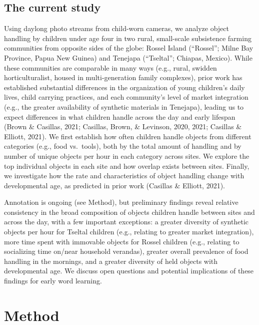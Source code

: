 \documentclass[10pt, letterpaper]{article}
\begin{document}
\hypertarget{the-current-study}{%
\subsection{The current study}\label{the-current-study}}

Using daylong photo streams from child-worn cameras, we analyze object
handling by children under age four in two rural, small-scale
subsistence farming communities from opposite sides of the globe: Rossel
Island (``Rossel''; Milne Bay Province, Papua New Guinea) and Tenejapa
(``Tseltal''; Chiapas, Mexico). While these communities are comparable
in many ways (e.g., rural, swidden horticulturalist, housed in
multi-generation family complexes), prior work has established
substantial differences in the organization of young children's daily
lives, child carrying practices, and each community's level of market
integration (e.g., the greater availability of synthetic materials in
Tenejapa), leading us to expect differences in what children handle
across the day and early lifespan (Brown \& Casillas, 2021; Casillas,
Brown, \& Levinson, 2020, 2021; Casillas \& Elliott, 2021). We first
establish how often children handle objects from different categories
(e.g., food vs.~tools), both by the total amount of handling and by
number of unique objects per hour in each category across sites. We
explore the top individual objects in each site and how overlap exists
between sites. Finally, we investigate how the rate and characteristics
of object handling change with developmental age, as predicted in prior
work (Casillas \& Elliott, 2021).

Annotation is ongoing (see Method), but preliminary findings reveal
relative consistency in the broad composition of objects children handle
between sites and across the day, with a few important exceptions: a
greater diversity of synthetic objects per hour for Tseltal children
(e.g., relating to greater market integration), more time spent with
immovable objects for Rossel children (e.g., relating to socializing
time on/near household verandas), greater overall prevalence of food
handling in the mornings, and a greater diversity of held objects with
developmental age. We discuss open questions and potential implications
of these findings for early word learning.

\hypertarget{method}{%
\section{Method}\label{method}}
\end{document}
